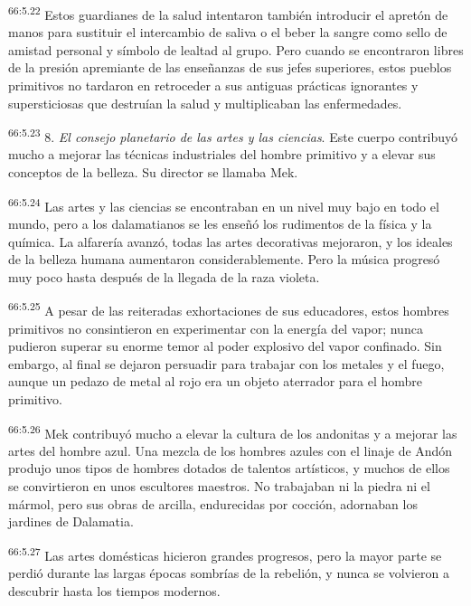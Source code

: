 \par
\textsuperscript{66:5.22} Estos guardianes de la salud intentaron también introducir el apretón de manos para sustituir el intercambio de saliva o el beber la sangre como sello de amistad personal y símbolo de lealtad al grupo. Pero cuando se encontraron libres de la presión apremiante de las enseñanzas de sus jefes superiores, estos pueblos primitivos no tardaron en retroceder a sus antiguas prácticas ignorantes y supersticiosas que destruían la salud y multiplicaban las enfermedades.

\par
\textsuperscript{66:5.23} 8. \textit{El consejo planetario de las artes y las ciencias}. Este cuerpo contribuyó mucho a mejorar las técnicas industriales del hombre primitivo y a elevar sus conceptos de la belleza. Su director se llamaba Mek.

\par
\textsuperscript{66:5.24} Las artes y las ciencias se encontraban en un nivel muy bajo en todo el mundo, pero a los dalamatianos se les enseñó los rudimentos de la física y la química. La alfarería avanzó, todas las artes decorativas mejoraron, y los ideales de la belleza humana aumentaron considerablemente. Pero la música progresó muy poco hasta después de la llegada de la raza violeta.

\par
\textsuperscript{66:5.25} A pesar de las reiteradas exhortaciones de sus educadores, estos hombres primitivos no consintieron en experimentar con la energía del vapor; nunca pudieron superar su enorme temor al poder explosivo del vapor confinado. Sin embargo, al final se dejaron persuadir para trabajar con los metales y el fuego, aunque un pedazo de metal al rojo era un objeto aterrador para el hombre primitivo.

\par
\textsuperscript{66:5.26} Mek contribuyó mucho a elevar la cultura de los andonitas y a mejorar las artes del hombre azul. Una mezcla de los hombres azules con el linaje de Andón produjo unos tipos de hombres dotados de talentos artísticos, y muchos de ellos se convirtieron en unos escultores maestros. No trabajaban ni la piedra ni el mármol, pero sus obras de arcilla, endurecidas por cocción, adornaban los jardines de Dalamatia.

\par
\textsuperscript{66:5.27} Las artes domésticas hicieron grandes progresos, pero la mayor parte se perdió durante las largas épocas sombrías de la rebelión, y nunca se volvieron a descubrir hasta los tiempos modernos.

